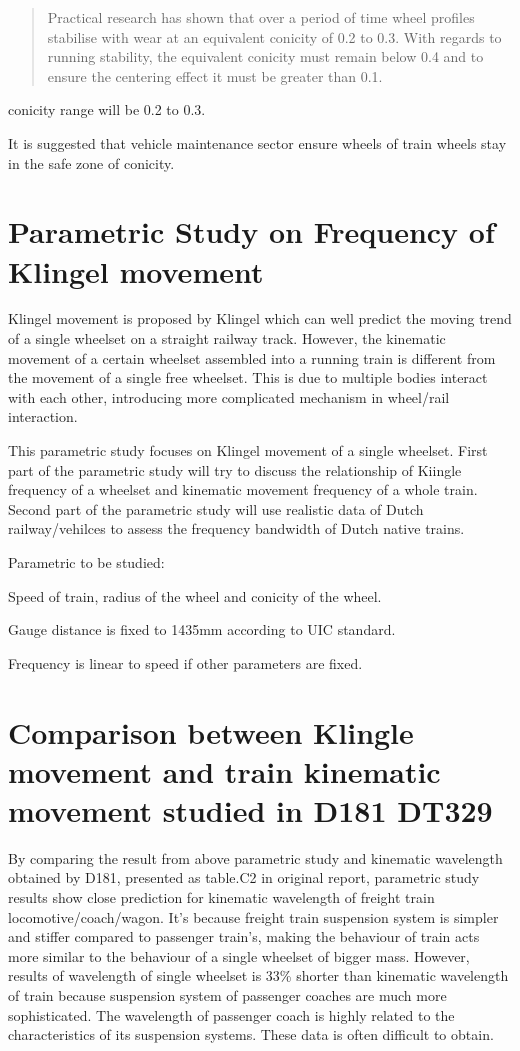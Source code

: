 \begin{quote}
    Practical research has shown that over a period of time wheel profiles stabilise with wear at an equivalent conicity of 0.2 to 0.3. With regards to running stability, the equivalent conicity must remain below 0.4 and to ensure the centering effect it must be greater than 0.1.
\end{quote}

conicity range will be 0.2 to 0.3.

It is suggested that vehicle maintenance sector ensure wheels of train wheels stay in the safe zone of conicity. 


\section{Parametric Study on Frequency of Klingel movement}

Klingel movement is proposed by Klingel which can well predict the moving trend of a single wheelset on a straight railway track. However, the kinematic movement of a certain wheelset assembled into a running train is different from the movement of a single free wheelset. This is due to multiple bodies interact with each other, introducing more complicated mechanism in wheel/rail interaction. 

This parametric study focuses on Klingel movement of a single wheelset. First part of the parametric study will try to discuss the relationship of Kiingle frequency of a wheelset and kinematic movement frequency of a whole train. Second part of the parametric study will use realistic data of Dutch railway/vehilces to assess the frequency bandwidth of Dutch native trains.

Parametric to be studied:

Speed of train, radius of the wheel and conicity of the wheel. 

Gauge distance is fixed to 1435mm according to UIC standard. 

Frequency is linear to speed if other parameters are fixed.

\section{Comparison between Klingle movement and train kinematic movement studied in D181 DT329}

By comparing the result from above parametric study and kinematic wavelength obtained by D181, presented as table.C2 in original report, parametric study results show close prediction for kinematic wavelength of freight train locomotive/coach/wagon. It's because freight train suspension system is simpler and stiffer compared to passenger train's, making the behaviour of train acts more similar to the behaviour of a single wheelset of bigger mass. However, results of  wavelength of single wheelset is 33\% shorter than kinematic wavelength of train because suspension system of passenger coaches are much more sophisticated. The wavelength of passenger coach is highly related to the characteristics of its suspension systems. These data is often difficult to obtain. 



